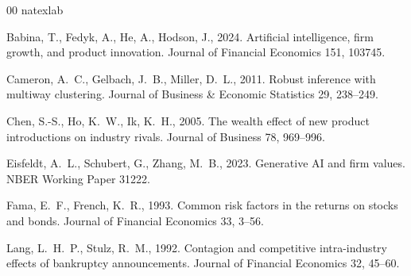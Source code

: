 \documentclass[review,12pt,authoryear]{elsarticle}
\begin{document}
\begin{thebibliography}{00}
\expandafter\ifx\csname natexlab\endcsname\relax\def\natexlab#1{#1}\fi

Babina, T., Fedyk, A., He, A., Hodson, J., 2024. Artificial intelligence,
firm growth, and product innovation. Journal of Financial Economics 151,
103745.

Cameron, A.~C., Gelbach, J.~B., Miller, D.~L., 2011. Robust inference
with multiway clustering. Journal of Business \& Economic Statistics 29,
238--249.

Chen, S.-S., Ho, K.~W., Ik, K.~H., 2005. The wealth effect of new product
introductions on industry rivals. Journal of Business 78, 969--996.

Eisfeldt, A.~L., Schubert, G., Zhang, M.~B., 2023. Generative AI and firm
values. NBER Working Paper 31222.

Fama, E.~F., French, K.~R., 1993. Common risk factors in the returns on
stocks and bonds. Journal of Financial Economics 33, 3--56.

Lang, L.~H.~P., Stulz, R.~M., 1992. Contagion and competitive
intra-industry effects of bankruptcy announcements. Journal of Financial
Economics 32, 45--60.

\end{thebibliography}
\end{document}
